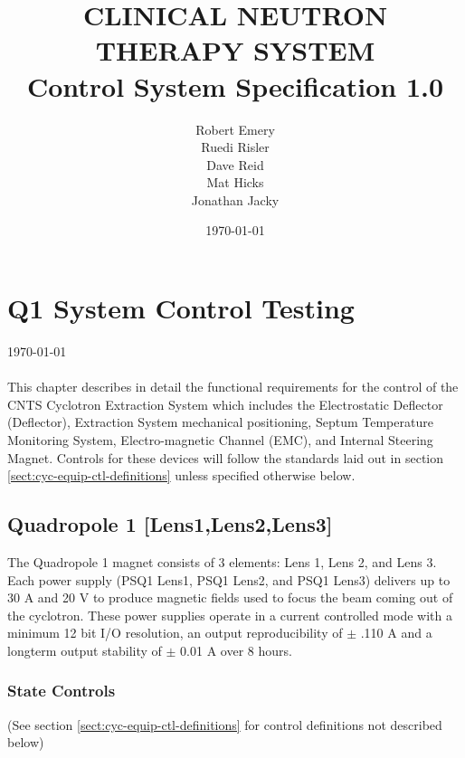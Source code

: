 \documentclass[11pt]{book}		%
\title{CLINICAL NEUTRON THERAPY SYSTEM\\
	Control System Specification 1.0\\[1.0cm]}
\author{Robert Emery\\
	Ruedi Risler\\
	Dave Reid \\
	Mat Hicks \\
        Jonathan Jacky}
\date{\today}
\begin{document}
\chapter{Q1 System Control Testing} \label{ch:cyc-equip-ctl-beamline}

\vspace*{-.75in}
\today \\
\vspace*{.75in}
\\

This chapter describes in detail the functional requirements for the control of the CNTS Cyclotron Extraction System which includes the Electrostatic Deflector (Deflector), Extraction System mechanical positioning, Septum Temperature Monitoring System, Electro-magnetic Channel (EMC), and Internal Steering Magnet.  Controls for these devices will follow the standards laid out in section \ref{sect:cyc-equip-ctl-definitions} unless specified otherwise below.

\section{Quadropole 1 [Lens1,Lens2,Lens3]} \label{sect:cyc-equip-ctl-beamline-quad1}

The Quadropole 1 magnet consists of 3 elements: Lens 1, Lens 2, and Lens 3. Each power supply (PSQ1 Lens1, PSQ1 Lens2, and PSQ1 Lens3) delivers up to 30 A and 20 V to produce magnetic fields used to focus the beam coming out of the cyclotron.  These power supplies operate in a current controlled mode with a minimum 12 bit I/O resolution, an output reproducibility of $\pm$ .110 A and a longterm output stability of $\pm$ 0.01 A over 8 hours.


\subsection{State Controls} \label{sect:cyc-equip-ctl-beamline-sm23a-state-controls}
(See section \ref{sect:cyc-equip-ctl-definitions} for control definitions not described below)
\end{document}
